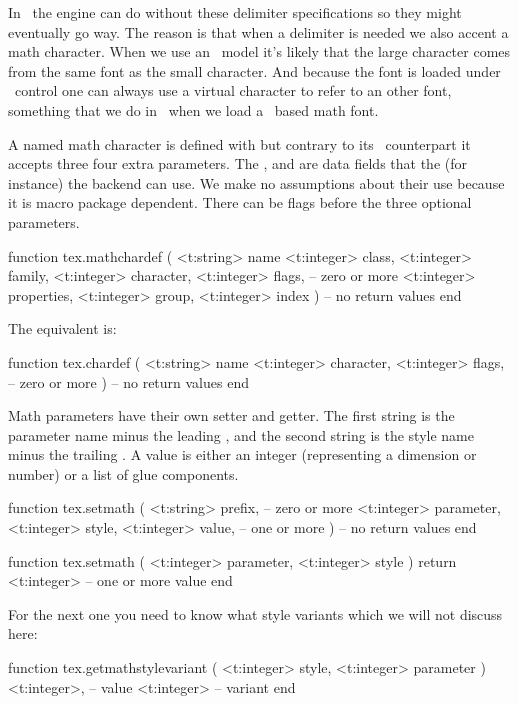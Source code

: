 In \LUAMETATEX\ the engine can do without these delimiter specifications so they
might eventually go way. The reason is that when a delimiter is needed we also
accent a math character. When we use an \OPENTYPE\ model it's likely that the
large character comes from the same font as the small character. And because the
font is loaded under \LUA\ control one can always use a virtual character to
refer to an other font, something that we do in \CONTEXT\ when we load a
\TYPEONE\ based math font.

A named math character is defined with  but contrary to its
\TEX\ counterpart \typ {\mathchardef} it accepts three four extra parameters.
The ,  and  are data fields that the
(for instance) the backend can use. We make no assumptions about their use
because it is macro package dependent. There can be flags before the three
optional parameters.

\starttyping[option=LUA]
function tex.mathchardef (
    <t:string>  name
    <t:integer> class,
    <t:integer> family,
    <t:integer> character,
    <t:integer> flags,  -- zero or more
    <t:integer> properties,
    <t:integer> group,
    <t:integer> index
)
    -- no return values
end
\stoptyping

The \type {\chardef} equivalent is:

\starttyping[option=LUA]
function tex.chardef (
    <t:string>  name
    <t:integer> character,
    <t:integer> flags,  -- zero or more
)
    -- no return values
end
\stoptyping

Math parameters have their own setter and getter. The first string is the
parameter name minus the leading , and the second string is the
style name minus the trailing . A value is either an integer
(representing a dimension or number) or a list of glue components.

\starttyping[option=LUA]
function tex.setmath (
    <t:string>  prefix, -- zero or more
    <t:integer> parameter,
    <t:integer> style,
    <t:integer> value,  -- one or more
)
    -- no return values
end
\stoptyping

\starttyping[option=LUA]
function tex.setmath (
    <t:integer> parameter,
    <t:integer> style
)
    return <t:integer> -- one or more value
end
\stoptyping

For the next one you need to know what style variants which we will not discuss
here:

\starttyping[option=LUA]
function tex.getmathstylevariant (
    <t:integer> style,
    <t:integer> parameter
)
    <t:integer>, -- value
    <t:integer>  -- variant
end
\stoptyping

